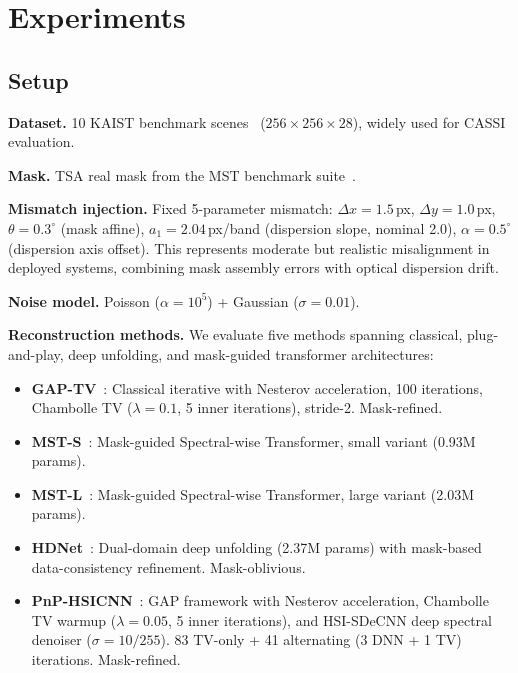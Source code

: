 \documentclass[runningheads]{llncs}
\begin{document}
\section{Experiments}
\label{sec:experiments}

\subsection{Setup}

\textbf{Dataset.} 10 KAIST benchmark scenes~\cite{choi2017kaist} ($256 \times 256 \times 28$), widely used for CASSI evaluation.

\textbf{Mask.} TSA real mask from the MST benchmark suite~\cite{cai2022mst}.

\textbf{Mismatch injection.} Fixed 5-parameter mismatch: $\Delta x = 1.5$\,px, $\Delta y = 1.0$\,px, $\theta = 0.3^\circ$ (mask affine), $a_1 = 2.04$\,px/band (dispersion slope, nominal 2.0), $\alpha = 0.5^\circ$ (dispersion axis offset).
This represents moderate but realistic misalignment in deployed systems, combining mask assembly errors with optical dispersion drift.

\textbf{Noise model.} Poisson ($\alpha = 10^5$) + Gaussian ($\sigma = 0.01$).

\textbf{Reconstruction methods.}
We evaluate five methods spanning classical, plug-and-play, deep unfolding, and mask-guided transformer architectures:
\begin{itemize}
    \item \textbf{GAP-TV}~\cite{yuan2016gap}: Classical iterative with Nesterov acceleration, 100 iterations, Chambolle TV ($\lambda{=}0.1$, 5 inner iterations), stride-2. Mask-refined.
    \item \textbf{MST-S}~\cite{cai2022mst}: Mask-guided Spectral-wise Transformer, small variant (0.93M params).
    \item \textbf{MST-L}~\cite{cai2022mst}: Mask-guided Spectral-wise Transformer, large variant (2.03M params).
    \item \textbf{HDNet}~\cite{hu2022hdnet}: Dual-domain deep unfolding (2.37M params) with mask-based data-consistency refinement. Mask-oblivious.
    \item \textbf{PnP-HSICNN}~\cite{yuan2020pnpcassi}: GAP framework with Nesterov acceleration, Chambolle TV warmup ($\lambda{=}0.05$, 5 inner iterations), and HSI-SDeCNN deep spectral denoiser ($\sigma{=}10/255$). 83 TV-only + 41 alternating (3 DNN + 1 TV) iterations. Mask-refined.
\end{itemize}
\end{document}

